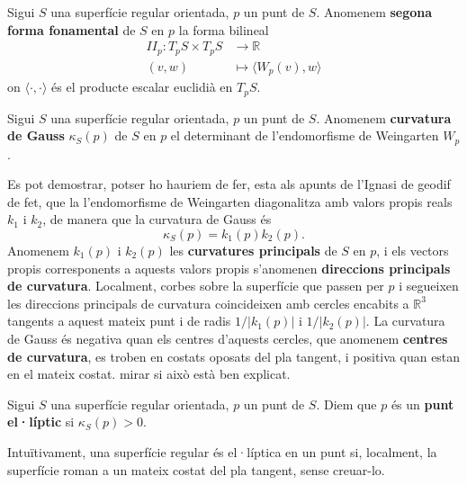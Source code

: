 \begin{defi}
    Sigui $S$ una superfície regular orientada, $p$ un punt de $S$. Anomenem \textbf{segona forma fonamental} de $S$ en $p$ la forma bilineal
    \begin{align*}
        II_p:T_pS\times T_pS&\to\mathbb R\\
        (v,w)&\mapsto \langle W_p(v),w\rangle
    \end{align*}
    on $\langle\cdot,\cdot\rangle$ és el producte escalar euclidià en $T_pS$.
\end{defi}

\begin{defi}
    Sigui $S$ una superfície regular orientada, $p$ un punt de $S$. Anomenem \textbf{curvatura de Gauss} $\kappa_S(p)$ de $S$ en $p$ el determinant de l'endomorfisme de Weingarten $W_p$.
\end{defi}

Es pot demostrar, {\color{blue} potser ho hauriem de fer, esta als apunts de l'Ignasi de geodif} de fet, que la l'endomorfisme de Weingarten diagonalitza amb valors propis reals $k_1$ i $k_2$, de manera que la curvatura de Gauss és
\begin{equation*}
    \kappa_S(p) = k_1(p)k_2(p).
\end{equation*}
Anomenem $k_1(p)$ i $k_2(p)$ les \textbf{curvatures principals} de $S$ en $p$, i els vectors propis corresponents a aquests valors propis s'anomenen \textbf{direccions principals de curvatura}. Localment, corbes sobre la superfície que passen per $p$ i segueixen les direccions principals de curvatura coincideixen amb cercles encabits a $\mathbb R^3$ tangents a aquest mateix punt i de radis $1/|k_1(p)|$ i $1/|k_2(p)|$.  La curvatura de Gauss és negativa quan els centres d'aquests cercles, que anomenem \textbf{centres de curvatura}, es troben en costats oposats del pla tangent, i positiva quan estan en el mateix costat.  {\color{blue}mirar si això està ben explicat.}

\begin{defi}
    Sigui $S$ una superfície regular orientada, $p$ un punt de $S$. Diem que $p$ és un \textbf{punt el·líptic} si $\kappa_S(p) > 0$.
\end{defi}

Intuïtivament, una superfície regular és el·líptica en un punt si, localment, la superfície roman a un mateix costat del pla tangent, sense creuar-lo. 

